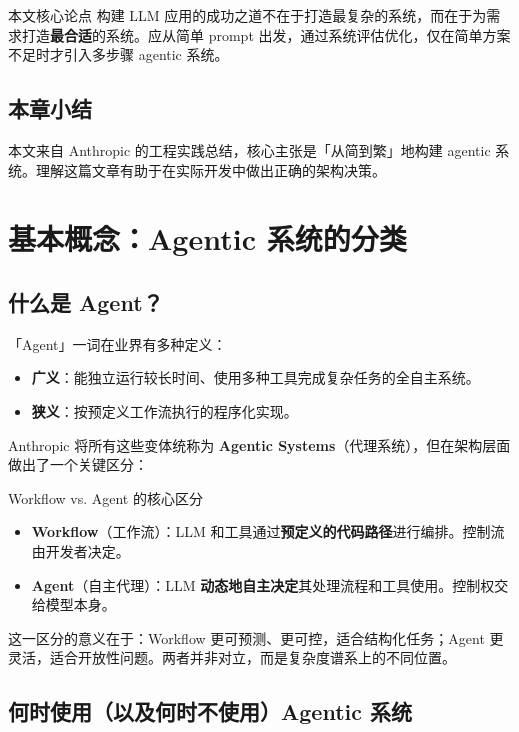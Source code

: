 \documentclass[a4paper]{article}
\begin{document}
\begin{importantbox}{本文核心论点}
构建 LLM 应用的成功之道不在于打造最复杂的系统，而在于为需求打造\textbf{最合适}的系统。应从简单 prompt 出发，通过系统评估优化，仅在简单方案不足时才引入多步骤 agentic 系统。
\end{importantbox}

\subsection{本章小结}
本文来自 Anthropic 的工程实践总结，核心主张是「从简到繁」地构建 agentic 系统。理解这篇文章有助于在实际开发中做出正确的架构决策。


\section{基本概念：Agentic 系统的分类}

\subsection{什么是 Agent？}

「Agent」一词在业界有多种定义：
\begin{itemize}
    \item \textbf{广义}：能独立运行较长时间、使用多种工具完成复杂任务的全自主系统。
    \item \textbf{狭义}：按预定义工作流执行的程序化实现。
\end{itemize}

Anthropic 将所有这些变体统称为 \textbf{Agentic Systems}（代理系统），但在架构层面做出了一个关键区分：

\begin{importantbox}{Workflow vs. Agent 的核心区分}
\begin{itemize}
    \item \textbf{Workflow}（工作流）：LLM 和工具通过\textbf{预定义的代码路径}进行编排。控制流由开发者决定。
    \item \textbf{Agent}（自主代理）：LLM \textbf{动态地自主决定}其处理流程和工具使用。控制权交给模型本身。
\end{itemize}
\end{importantbox}

这一区分的意义在于：Workflow 更可预测、更可控，适合结构化任务；Agent 更灵活，适合开放性问题。两者并非对立，而是复杂度谱系上的不同位置。

\subsection{何时使用（以及何时不使用）Agentic 系统}
\end{document}
